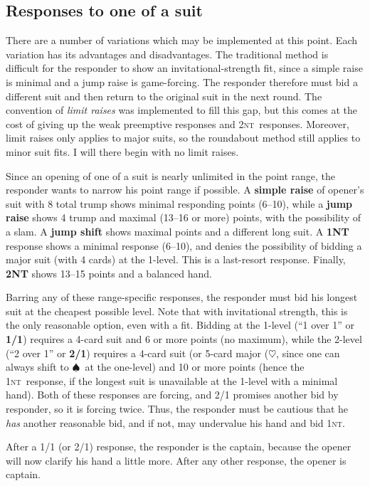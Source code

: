 \documentclass[11pt]{article}
\def\H{$\heartsuit$}
\def\S{$\spadesuit$}
\def\NT{\textsc{nt}}
\begin{document}
\subsection{Responses to one of a suit}
There are a number of variations which may be implemented at this
point.  Each variation has its advantages and disadvantages.  The
traditional method is difficult for the responder to show an
invitational-strength fit, since a simple raise is minimal and a jump
raise is game-forcing.  The responder therefore must bid a different
suit and then return to the original suit in the next round.  The
convention of \emph{limit raises} was implemented to fill this gap,
but this comes at the cost of giving up the weak preemptive responses
and 2\NT\ responses.  Moreover, limit raises only applies to major
suits, so the roundabout method still applies to minor suit fits.  I
will there begin with no limit raises.

Since an opening of one of a suit is nearly unlimited in the point
range, the responder wants to narrow his point range if possible.  A
\textbf{simple raise} of opener's suit with 8 total trump shows
minimal responding points (6--10), while a \textbf{jump raise} shows 4
trump and maximal (13--16 or more) points, with the possibility of a
slam.  A \textbf{jump shift} shows maximal points and a different long
suit.  A \textbf{1NT} response shows a minimal response (6--10), and 
denies the possibility of bidding a major suit (with 4 cards) at the
1-level.  This is a last-resort response.  Finally, \textbf{2NT} shows
13--15 points and a balanced hand.

Barring any of these range-specific responses, the responder must bid
his longest suit at the cheapest possible level.  Note that with
invitational strength, this is the only reasonable option, even with a
fit.  Bidding at the 1-level (``1 over 1'' or \textbf{1/1}) requires a
4-card suit and 6 or more points (no maximum), while the 2-level (``2
over 1'' or \textbf{2/1}) requires a 4-card suit (or 5-card major (\H,
since one can always shift to \S\ at the one-level) and 10 or more
points (hence the 1\NT\ response, if the longest suit is unavailable
at the 1-level with a minimal hand).  Both of these responses are
forcing, and 2/1 promises another bid by responder, so it is forcing
twice.  Thus, the responder must be cautious that he \emph{has}
another reasonable bid, and if not, may undervalue his hand and bid
1\NT.

After a 1/1 (or 2/1) response, the responder is the captain, because the
opener will now clarify his hand a little more.  After any other
response, the opener is captain.
\end{document}
